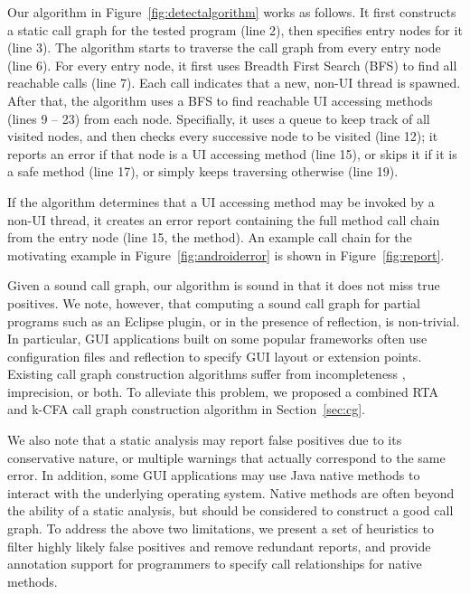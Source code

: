 Our algorithm in Figure~\ref{fig:detectalgorithm} works as follows. It
first constructs a static call graph for the tested program (line 2),
then specifies entry nodes for it (line 3). The algorithm starts to traverse
the call graph from every entry node (line 6). For every entry node,
it first uses Breadth First Search (BFS) to find all reachable
 calls (line 7). Each  call
indicates that a new, non-UI thread is spawned.  After that, 
the algorithm uses a BFS to find reachable UI accessing methods (lines 9 -- 23)
from each  node.
Specifially, it uses a queue to keep track of all visited nodes, and
then checks every successive node to be visited (line 12);
it reports an error if that node
is a UI accessing method (line 15), or skips it if it is
a safe method (line 17), or simply keeps traversing otherwise (line 19).

If the algorithm determines that a UI accessing method may be invoked
by a non-UI thread, it creates an error report containing the full
method call chain from the entry node (line 15, the 
method). An example call chain for
the motivating example in Figure~\ref{fig:androiderror} is shown
in Figure~\ref{fig:report}.

Given a sound call graph, our algorithm is sound in that it does not
miss true positives. We note, however, that computing a sound
call graph for partial programs such as an Eclipse plugin,
or in the presence of reflection, is non-trivial. 
In particular, GUI applications built on some popular frameworks
often use configuration files and reflection to specify GUI layout
or extension points.
Existing call graph construction algorithms suffer from incompleteness
, imprecision, or both.  To alleviate this problem, 
we proposed a combined RTA
and k-CFA call graph construction algorithm in Section~\ref{sec:cg}.


We also note that a static analysis may report false positives due
to its conservative nature, or multiple warnings that actually correspond to
the same error. In addition, some GUI applications may use
Java native methods to interact with the underlying operating system.
Native methods are often beyond the ability of a static analysis, but
should be considered to construct a good call graph. To address the
above two limitations, we present a set of heuristics to filter
highly likely false positives and remove redundant reports, and provide
annotation support for programmers to specify call relationships for
 native methods.


